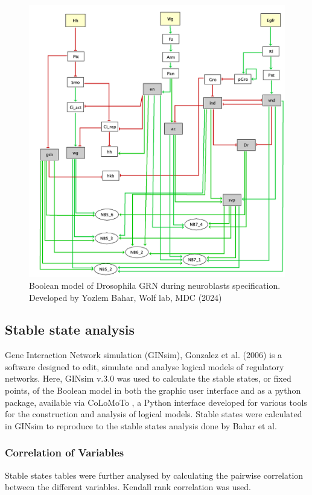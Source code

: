 \begin{figure}[ht]
    \centering
    \includegraphics[scale=0.5]{figures/methods/Original_Model.png}
    \caption{Boolean model of Drosophila GRN during neuroblasts specification. Developed by Yozlem Bahar, Wolf lab, MDC (2024)}
    
    \label{fig:BoolModel1}
\end{figure}

\subsection{Stable state analysis}
Gene Interaction Network simulation (GINsim), Gonzalez et al. (2006)\cite{gonzalez2006ginsim} is a software designed to edit, 
simulate and analyse logical models of regulatory networks.
Here, GINsim v.3.0 \cite{naldi2018logical} was used to calculate the stable states, or fixed points, of the Boolean model in 
both the graphic user interface and as a python package, available via CoLoMoTo \cite{naldi2018colomoto}, a Python interface 
developed for various tools for the construction and analysis of logical models. 
Stable states were calculated in GINsim to reproduce to the stable states analysis done by Bahar et al. 

\subsubsection{Correlation of Variables}
Stable states tables were further analysed by calculating the pairwise correlation between the different variables. 
Kendall rank correlation was used.  

